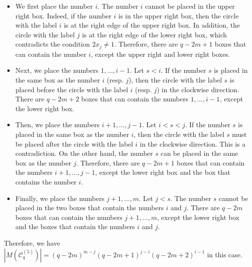 \documentclass{article}
\theoremstyle{plain}
\theoremstyle{definition}
\theoremstyle{remark}
\numberwithin{equation}{section}
\newcommand{\Cc}{\mathcal{C}}
\begin{document}
\fi
\begin{itemize}
\item We first place the number $i$.
The number $i$ cannot be placed in the upper right box.
Indeed, if the number $i$ is in the upper right box, then the circle with the label $i$ is at the right edge of the upper right box.
In addition, the circle with the label $j$ is at the right edge of the lower right box, which contradicts the condition $2x_j\neq 1$.
Therefore, there are $q-2m+1$ boxes that can contain the number $i$, except the upper right and lower right boxes.
\item Next, we place the numbers $1,\dots,i-1$. Let $s<i$.
If the number $s$ is placed in the same box as the number $i$ (resp. $j$), then the circle with the label $s$ is placed before the circle with the label $i$ (resp. $j$) in the clockwise direction.
There are $q-2m+2$ boxes that can contain the numbers $1,\dots,i-1$, except the lower right box.
\item Then, we place the numbers $i+1,\dots,j-1$. Let $i<s<j$.
If the number $s$ is placed in the same box as the number $i$, then the circle with the label $s$ must be placed after the circle with the label $i$ in the clockwise direction.
This is a contradiction.
On the other hand, the number $s$ can be placed in the same box as the number $j$.
Therefore, there are $q-2m+1$ boxes that can contain the numbers $i+1,\dots,j-1$, except the lower right box and the box that contains the number $i$.
\item Finally, we place the numbers $j+1,\dots,m$. Let $j<s$.
The number $s$ cannot be placed in the two boxes that contain the numbers $i$ and $j$.
There are $q-2m$ boxes that can contain the numbers $j+1,\dots,m$, except the lower right box and the boxes that contain the numbers $i$ and $j$.
\end{itemize}
Therefore, we have $|M(\Cc^{(5)}_q)|=(q-2m)^{m-j}(q-2m+1)^{j-i}(q-2m+2)^{i-1}$ in this case.
\end{document}
